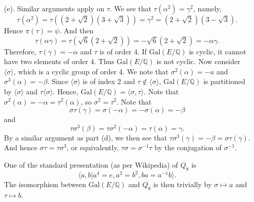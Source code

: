 \documentclass[12pt,reqno]{article}
\theoremstyle{definition}
\newcommand{\gal}{\mbox{Gal}}
\newcommand{\ta}[1]{\langle #1 \rangle}
\newcommand{\qq}{\mathbb{Q}}
\begin{document}
\begin{solution}{1}
\begin{enumerate}
		\item[(e).] Similar arguments apply on $\tau$. We see that $\tau(\alpha^2)=\gamma^2$, namely, \[\tau(\alpha^2)=\tau((2+\sqrt{2})(3+\sqrt{3}))=\gamma^2 =(2+\sqrt{2})(3-\sqrt{3}).\] Hence $\pi(\tau)=\psi$. And then $$\tau(\alpha\gamma)=\tau(\sqrt{6}(2+\sqrt{2}))=-\sqrt{6}(2+\sqrt{2})=-\alpha\gamma.$$ Therefore, $\tau(\gamma)= -\alpha$ and $\tau$ is of order 4. If $\gal(E/\qq)$ is cyclic, it cannot have two elements of order $4$. Thus $\gal(E/\qq)$ is not cyclic. Now consider $\ta{\sigma}$, which is a cyclic group of order 4. We note that $\sigma^2(\alpha)=-a$ and $\sigma^3(\alpha)=-\beta$. Since $\ta{\sigma}$ is of index 2 and $\tau\notin \ta{\sigma}$, $\gal(E/\qq)$ is partitioned by $\ta{\sigma}$ and $\tau\ta{\sigma}$. Hence, $\gal(E/\qq)=\ta{\sigma,\tau}$. Note that $\sigma^2(\alpha)=-\alpha=\tau^2(\alpha)$, so $\sigma^2=\tau^2$. Note that $$\sigma\tau(\gamma)=\sigma(-\alpha)=-\sigma(\alpha)=-\beta$$ and $$\tau\sigma^3(\beta)=\tau\sigma^2(-\alpha)=\tau(\alpha)=\gamma.$$ By a similar argument as part (d), we then see that $\tau\sigma^3(\gamma)=-\beta=\sigma\tau(\gamma)$. And hence $\sigma\tau=\tau\sigma^3$, or equivalently, $\tau\sigma = \sigma^{-1}\tau$ by the conjugation of $\sigma^{-1}$.

		      One of the standard presentation (as per Wikipedia) of $Q_8$ is $$\ta{a,b|a^4=e,a^2=b^2,ba=a^{-1}b}.$$ The isomorphism between $\gal(E/\qq)$ and $Q_8$ is then trivially by $\sigma\mapsto a$ and $\tau\mapsto b$.
	\end{enumerate}
\end{solution}
\end{document}
